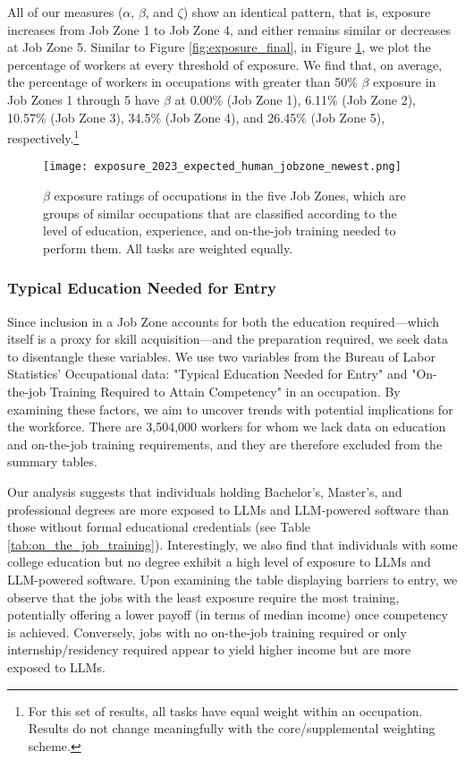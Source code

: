\documentclass[11pt]{article}
\begin{document}
All of our measures ($\alpha$, $\beta$, and $\zeta$) show an identical pattern, that is, exposure increases from Job Zone 1 to Job Zone 4, and either remains similar or decreases at Job Zone 5. Similar to Figure \ref{fig:exposure_final}, in Figure \ref{fig:job_zone_plots}, we plot the percentage of workers at every threshold of exposure. We find that, on average, the percentage of workers in occupations with greater than 50\% $\beta$ exposure in Job Zones 1 through 5 have $\beta$ at 0.00\% (Job Zone 1), 6.11\% (Job Zone 2), 10.57\% (Job Zone 3), 34.5\% (Job Zone 4), and 26.45\% (Job Zone 5), respectively.\footnote{For this set of results, all tasks have equal weight within an occupation. Results do not change meaningfully with the core/supplemental weighting scheme.} 


\label{table:job_zone_table}

\begin{figure}
    \centering
    \texttt{[image: exposure\_2023\_expected\_human\_jobzone\_newest.png]}
    \caption{$\beta$ exposure ratings of occupations in the five Job Zones, which are groups of similar occupations that are classified according to the level of education, experience, and on-the-job training needed to perform them. All tasks are weighted equally.}
    \label{fig:job_zone_plots}
\end{figure}


\subsubsection{Typical Education Needed for Entry}

Since inclusion in a Job Zone accounts for both the education required—which itself is a proxy for skill acquisition—and the preparation required, we seek data to disentangle these variables. We use two variables from the Bureau of Labor Statistics' Occupational data: "Typical Education Needed for Entry" and "On-the-job Training Required to Attain Competency" in an occupation. By examining these factors, we aim to uncover trends with potential implications for the workforce. There are 3,504,000 workers for whom we lack data on education and on-the-job training requirements, and they are therefore excluded from the summary tables.

Our analysis suggests that individuals holding Bachelor's, Master's, and professional degrees are more exposed to LLMs and LLM-powered software than those without formal educational credentials (see Table \ref{tab:on_the_job_training}). Interestingly, we also find that individuals with some college education but no degree exhibit a high level of exposure to LLMs and LLM-powered software. Upon examining the table displaying barriers to entry, we observe that the jobs with the least exposure require the most training, potentially offering a lower payoff (in terms of median income) once competency is achieved. Conversely, jobs with no on-the-job training required or only internship/residency required appear to yield higher income but are more exposed to LLMs.
\end{document}
